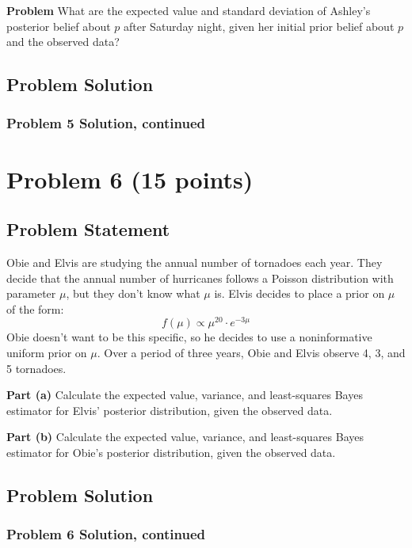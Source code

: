 \documentclass[12pt]{article}
\theoremstyle{definition}
\begin{document}
\bigskip
\noindent
{\bf Problem} What are the expected value and standard deviation of Ashley's posterior belief about $p$ after Saturday night, given her initial prior belief about $p$ and the observed data?




\subsection*{Problem Solution}


\newpage
\subsubsection*{Problem 5 Solution, continued}


\newpage
\section*{Problem 6 (15 points)}

\subsection*{Problem Statement}

Obie and Elvis are studying the annual number of tornadoes each year. They decide that the annual number of hurricanes follows a Poisson distribution with parameter $\mu$, but they don't know what $\mu$ is. Elvis decides to place a prior on $\mu$ of the form:
$$
f(\mu) \propto \mu^{20} \cdot e^{-3 \mu}
$$
Obie doesn't want to be this specific, so he decides to use a noninformative uniform prior on $\mu$. Over a period of three years, Obie and Elvis observe 4, 3, and 5 tornadoes.

\bigskip
\noindent
{\bf Part (a)} Calculate the expected value, variance, and least-squares Bayes estimator for Elvis' posterior distribution, given the observed data.

\bigskip
\noindent
{\bf Part (b)} Calculate the expected value, variance, and least-squares Bayes estimator for Obie's posterior distribution, given the observed data.





\subsection*{Problem Solution}


\newpage
\subsubsection*{Problem 6 Solution, continued}
\end{document}
